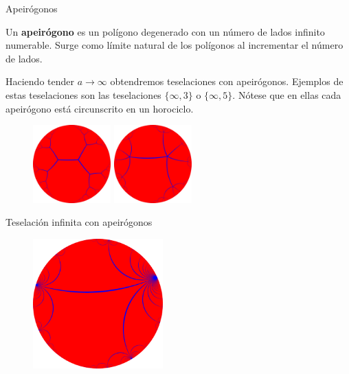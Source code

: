 \documentclass[compress]{beamer}
\begin{document}
\begin{frame}{Apeirógonos}
  \begin{definition}
    Un \textbf{apeirógono} es un polígono degenerado con un número de
    lados infinito numerable. Surge como límite natural de los polígonos
    al incrementar el número de lados.
  \end{definition}

  Haciendo tender $a \to \infty$ obtendremos teselaciones con
  apeirógonos.  Ejemplos de estas teselaciones son las teselaciones
  $\{\infty,3\}$ o $\{\infty,5\}$. Nótese que en ellas cada apeirógono
  está circunscrito en un horociclo.

  \begin{figure}[ht!]
    \centering
    \includegraphics[width=30mm]{./tiling-i-3.png}
    \quad
    \includegraphics[width=30mm]{./tiling-i-5.png}
  \end{figure}
\end{frame}

\begin{frame}{Teselación infinita con apeirógonos}
  \begin{figure}[ht!]
    \centering
    \includegraphics[width=50mm]{./tiling-i-i.png}
  \end{figure}
\end{frame}
\end{document}
